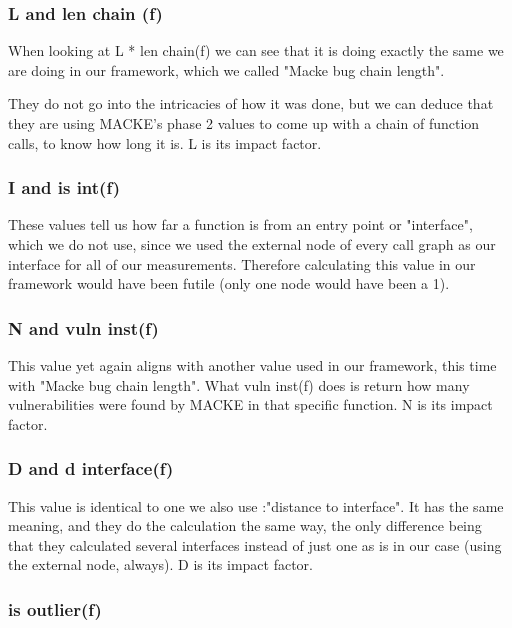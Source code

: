 \subsubsection{L and len chain (f)}

When looking at L * len chain(f) we can see that it is doing exactly the same we are doing in our framework, which we called "Macke bug chain length".

They do not go into the intricacies of how it was done, but we can deduce that they are using MACKE's phase 2 values to come up with a chain of function calls, to know how long it is. L is its impact factor.

\subsubsection{I and is int(f)}

These values tell us how far a function is from an entry point or "interface", which we do not use, since we used the external node of every call graph as our interface for all of our measurements. Therefore calculating this value in our framework would have been futile (only one node would have been a 1).

\subsubsection{N and vuln inst(f)}

This value yet again aligns with another value used in our framework, this time with "Macke bug chain length". What vuln inst(f) does is return how many vulnerabilities were found by MACKE in that specific function. N is its impact factor.

\subsubsection{D and d interface(f)}

This value is identical to one we also use :"distance to interface". It has the same meaning, and they do the calculation the same way, the only difference being that they calculated several interfaces instead of just one as is in our case (using the external node, always). D is its impact factor.

\subsubsection{is outlier(f)}

